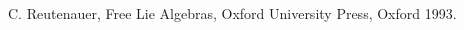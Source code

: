 \documentclass[11pt,a4paper]{article}
\begin{document}
\begin{thebibliography}{10}





 C. Reutenauer, Free Lie Algebras, Oxford University Press, Oxford 1993.




\end{thebibliography} 
\end{document}
